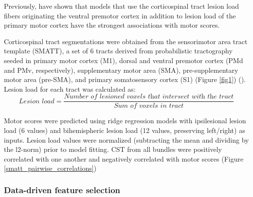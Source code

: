 \documentclass[10pt]{article}
\begin{document}
Previously, \cite{Ito2022-em} have shown that models that use the corticospinal tract lesion load fibers originating the ventral premotor cortex in addition to lesion load of the primary motor cortex have the strongest associations with motor scores.

Corticospinal tract segmentations were obtained from the sensorimotor area tract template (SMATT), a set of 6 tracts derived from probabilistic tractography seeded in primary motor cortex (M1), dorsal and ventral premotor cortex (PMd and PMv, respectively), supplementary motor area (SMA), pre-supplementary motor area (pre-SMA), and primary somatosensory cortex (S1) (Figure \ref{fig1}) (\cite{Archer2018-ti}). Lesion load for each tract was calculated as:
\begin{equation}
    \textit{Lesion load} = \frac{\textit{Number of lesioned voxels that intersect with the tract}}{\textit{Sum of voxels in tract}}
\end{equation}

Motor scores were predicted using ridge regression models with ipsilesional lesion load (6 values) and bihemispheric lesion load (12 values, preserving left/right) as inputs. Lesion load values were normalized (subtracting the mean and dividing by the l2-norm) prior to model fitting. CST from all bundles were positively correlated with one another and negatively correlated with motor scores (Figure \ref{smatt_pairwise_correlations})

\subsubsection{Data-driven feature selection}
\end{document}
